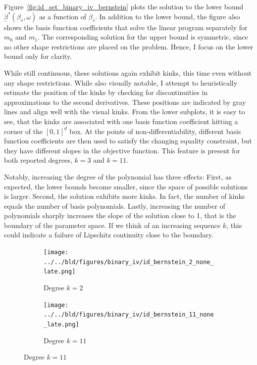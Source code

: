 \documentclass[12pt,a4paper,english]{article} %
\numberwithin{equation}{section}
\theoremstyle{definition}
\theoremstyle{remark}
\theoremstyle{plain}
\begin{document}
Figure~\ref{fig:id_set_binary_iv_bernstein} plots the solution to the lower bound $\underline{\beta}^*(\beta_s, \omega)$ as a function of $\beta_s$.
In addition to the lower bound, the figure also shows the basis function coefficients that solve the linear program separately for $m_0$ and $m_1$.
The corresponding solution for the upper bound is symmetric, since no other shape restrictions are placed on the problem. Hence, I focus on the lower bound only for clarity.

While still continuous, these solutions again exhibit kinks, this time even without any shape restrictions.
While also visually notable, I attempt to heuristically estimate the position of the kinks by checking for discontinuities in approximations to the second derivatives.
These positions are indicated by gray lines and align well with the visual kinks.
From the lower subplots, it is easy to see, that the kinks are associated with one basis function coefficient hitting a corner of the $[0,1]^d$ box.
At the points of non-differentiability, different basis function coefficients are then used to satisfy the changing equality constraint, but they have different slopes in the objective function.
This feature is present for both reported degrees, $k=3$ and $k=11$.

Notably, increasing the degree of the polynomial has three effects:
First, as expected, the lower bounds become smaller, since the space of possible solutions is larger.
Second, the solution exhibits more kinks. In fact, the number of kinks equals the number of basis polynomials.
Lastly, increasing the number of polynomials sharply increases the slope of the solution close to 1, that is the boundary of the parameter space.
If we think of an increasing sequence $k$, this could indicate a failure of Lipschitz continuity close to the boundary.

\begin{figure}

  \caption{Identified Sets for the Binary-IV Model with Bernstein Polynomial MTRs}\label{fig:id_set_binary_iv_bernstein}

  \centering
  \begin{subfigure}[b]{0.49\textwidth}
      \centering
      \texttt{[image: ../../bld/figures/binary\_iv/id\_bernstein\_2\_none\_late.png]}
      \caption{Degree $k=2$}\label{fig:id_set_binary_iv_bernstein_k_2}
  \end{subfigure}
  \hfill
  \begin{subfigure}[b]{0.49\textwidth}
      \centering
      \texttt{[image: ../../bld/figures/binary\_iv/id\_bernstein\_11\_none\_late.png]}
      \caption{Degree $k=11$}\label{fig:id_set_binary_iv_bernstein_k_11}
  \end{subfigure}
\end{figure}
\end{document}
